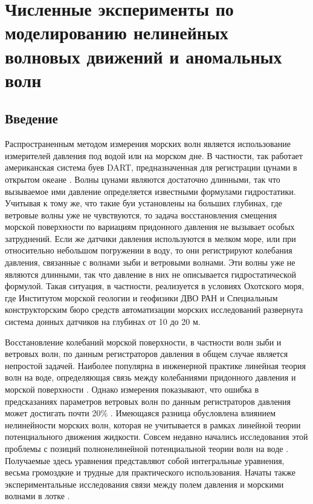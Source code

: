 \chapter{Численные эксперименты по моделированию нелинейных волновых движений и аномальных волн} \label{chapt3}

\section{Введение} \label{sect3_0}

Распространенным методом измерения морских волн является использование измерителей давления под водой или на морском дне. В частности, так работает американская система буев DART, предназначенная для регистрации цунами в открытом океане \cite{dart_Bernard}. Волны цунами являются достаточно длинными, так что вызываемое ими давление определяется известными формулами гидростатики. Учитывая к тому же, что такие буи установлены на больших глубинах, где ветровые волны уже не чувствуются, то задача восстановления смещения морской поверхности по вариациям придонного давления не вызывает особых затруднений. Если же датчики давления используются в мелком море, или при относительно небольшом погружении в воду, то они регистрируют колебания давления, связанные с волнами зыби и ветровыми волнами. Эти волны уже не являются длинными, так что давление в них не описывается гидростатической формулой. Такая ситуация, в частности, реализуется в условиях Охотского моря, где Институтом морской геологии и геофизики ДВО РАН \cite{firstResultsSakh_2009} и Специальным конструкторским бюро средств автоматизации морских исследований \cite{Zaits_Kuz_NGTU_2013} развернута система донных датчиков на глубинах от 10 до 20 м.

Восстановление колебаний морской поверхности, в частности волн зыби и ветровых волн, по данным регистраторов давления в общем случае является непростой задачей. Наиболее популярна в инженерной практике линейная теория волн на воде, определяющая связь между колебаниями придонного давления и морской поверхности \cite{Kuo_Chiu_1994} \cite{Zasl_Kras_2001} \cite{Tsai_Huang_2005} \cite{Baqueizo_Losada_1995}\cite{Huang_Tsai_2008}. Однако измерения показывают, что ошибка в предсказаниях параметров ветровых волн по данным регистраторов давления может достигать почти 20\% \cite{Bishop_Donelan_1987}. Имеющаяся разница обусловлена влиянием нелинейности морских волн, которая не учитывается в рамках линейной теории потенциального движения жидкости. Совсем недавно начались исследования этой проблемы с позиций полнонелинейной потенциальной теории волн на воде \cite{Esher_Schlurmann_2008} \cite{Constantin_Strauss_2010} \cite{Constantin_Esher_Hsu2011} \cite{Constantin_2012} \cite{Oliveras_2012} \cite{Deconink_2012}. Получаемые здесь уравнения представляют собой интегральные уравнения, весьма громоздкие и трудные для практического использования. Начаты также экспериментальные исследования связи между полем давления и морскими волнами в лотке \cite{Oliveras_2012}.

